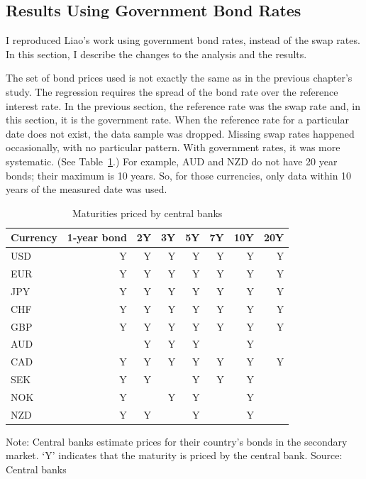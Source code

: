 \subsection{Results Using Government Bond Rates}

I reproduced Liao's work using government bond rates, instead of the swap rates.  In this section, I describe the changes to the analysis and the results.


The set of bond prices used is not exactly the same as in the previous chapter's study.  The regression requires the spread of the bond rate over the reference interest rate.  In the previous section, the reference rate was the swap rate and, in this section, it is the government rate.  When the reference rate for a particular date does not exist, the data sample was dropped.  Missing swap rates happened occasionally, with no particular pattern.  With government rates, it was more systematic.  (See Table~\ref{govt_maturities}.)  For example, AUD and NZD do not have 20 year bonds; their maximum is 10 years.  So, for those currencies, only data within 10 years of the measured date was used.

\begin{table}[H]
\caption{\label{govt_maturities} Maturities priced by central banks
}
\centering
\begin{tabular}{ |l|r|r|r|r|r|r|r| }
\hline
Currency & 1-year bond & 2Y & 3Y & 5Y & 7Y & 10Y & 20Y \\
\hline
USD & Y & Y & Y & Y & Y & Y & Y \\  
EUR & Y & Y & Y & Y & Y & Y & Y \\  
JPY & Y & Y & Y & Y & Y & Y & Y \\ 
CHF & Y & Y & Y & Y & Y & Y & Y \\ 
GBP & Y & Y & Y & Y & Y & Y & Y \\ 
AUD &   & Y & Y & Y &   & Y &   \\ 
CAD & Y & Y & Y & Y & Y & Y & Y \\ 
SEK & Y & Y &   & Y & Y & Y &   \\ 
NOK & Y &   & Y & Y &   & Y &   \\ 
NZD & Y & Y &   & Y &   & Y &   \\ 
\hline
\end{tabular}

\raggedright 
 Note: {\small Central banks estimate prices for their country's bonds in the secondary market.  `Y' indicates that the maturity is priced by the central bank.}
\newline Source: Central banks
\end{table}

